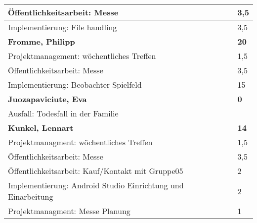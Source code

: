 \documentclass[a4paper,11pt]{scrartcl}
\begin{document}
\begin{longtable}{| p{13.8cm} | C{2.4cm} |}
  Öffentlichkeitsarbeit: Messe
	&
  3,5
	\\
	\hline

  Implementierung: File handling
	&
  3,5
	\\
	\hline
	\hline


	\textbf{Fromme, Philipp} & \textbf{20}\\ %
	\hline

	Projektmanagement: wöchentliches Treffen
	&
	1,5
	\\
	\hline

	Öffentlichkeitsarbeit: Messe
	&
	3,5
	\\
	\hline

  Implementierung: Beobachter Spielfeld
	&
  15
	\\
	\hline
	\hline


	\textbf{Juozapaviciute, Eva} & \textbf{0}\\ %
	\hline
	
  Ausfall: Todesfall in der Familie
	&
	\\
	\hline


	\hline
	\hline


	\textbf{Kunkel, Lennart} & \textbf{14}\\ %
	\hline

  Projektmanagment: wöchentliches Treffen
	&
  1,5
	\\
	\hline

  Öffentlichkeitsarbeit: Messe
	&
  3,5
	\\
	\hline

  Öffentlichkeitsarbeit: Kauf/Kontakt mit Gruppe05
	&
  2
	\\
	\hline

  Implementierung: Android Studio Einrichtung und Einarbeitung
	&
  2
	\\
	\hline

  Projektmanagment: Messe Planung
	&
  1
	\\
	\hline


\end{longtable}
\end{document}
